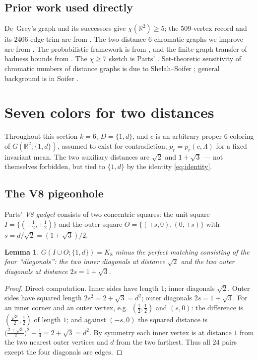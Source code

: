 \documentclass[11pt]{article}
\newtheorem{lemma}[theorem]{Lemma}
\theoremstyle{definition}
\theoremstyle{remark}
\newcommand{\R}{\mathbb{R}}
\newcommand{\dd}{d}                          %
\begin{document}
\subsection{Prior work used directly}

De~Grey's graph \cite{deGrey18} and its successors
\cite{Heule18,ExooIsmailescu18,Parts20b} give $\chi(\R^2)\ge5$; the
$509$-vertex record and its $2406$-edge trim are from
\cite{Parts20b,deGreyParts22}.  The two-distance $6$-chromatic graphs we
improve are from \cite{Parts20a,ExooIsmailescu20,DeNeve25}.  The
probabilistic framework is from \cite{Polymath16,Agoston21}, and the
finite-graph transfer of badness bounds from \cite{GwynStavrianos20}.
The $\chi\ge7$ sketch is Parts' \cite{Parts19}.  Set-theoretic
sensitivity of chromatic numbers of distance graphs is due to
Shelah--Soifer \cite{ShelahSoifer03}; general background is in Soifer
\cite{Soifer09}.

\section{Seven colors for two distances}\label{sec:seven}

Throughout this section $k=6$, $D=\{1,\dd\}$, and $c$ is an arbitrary
proper $6$-coloring of $G(\R^2;\{1,\dd\})$, assumed to exist for
contradiction; $p_r=p_r(c,\Lambda)$ for a fixed invariant mean.  The
two auxiliary distances are $\sqrt2$ and $1+\sqrt3$ --- not themselves
forbidden, but tied to $\{1,\dd\}$ by the identity \eqref{eq:identity}.

\subsection{The V8 pigeonhole}\label{sec:v8}

Parts' \emph{V8 gadget} consists of two concentric squares: the unit
square $I=\{(\pm\tfrac12,\pm\tfrac12)\}$ and the outer square
$O=\{(\pm s,0),(0,\pm s)\}$ with $s=\dd/\sqrt2=(1+\sqrt3)/2$.

\begin{lemma}\label{lem:v8geom}
$G(I\cup O;\{1,\dd\})=K_8$ minus the perfect matching consisting of the
four ``diagonals'': the two inner diagonals at distance $\sqrt2$ and the
two outer diagonals at distance $2s=1+\sqrt3$.
\end{lemma}

\begin{proof}
Direct computation.  Inner sides have length $1$; inner diagonals
$\sqrt2$.  Outer sides have squared length $2s^2=2+\sqrt3=\dd^2$; outer
diagonals $2s=1+\sqrt3$.  For an inner corner and an outer vertex, e.g.\
$(\tfrac12,\tfrac12)$ and $(s,0)$: the difference is
$(\tfrac{\sqrt3}2,\tfrac12)$ of length $1$; and against $(-s,0)$ the
squared distance is $\bigl(\tfrac{2+\sqrt3}{2}\bigr)^2+\tfrac14
=2+\sqrt3=\dd^2$.  By symmetry each inner vertex is at distance $1$ from
the two nearest outer vertices and $\dd$ from the two farthest.  Thus all
$24$ pairs except the four diagonals are edges.
\end{proof}
\end{document}
